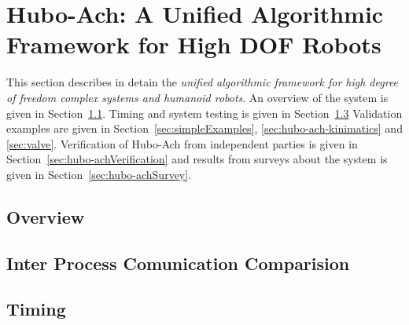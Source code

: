 \chapter{Hubo-Ach: A Unified Algorithmic Framework for High DOF Robots}\label{sec:hubo-ach}


This section describes in detain the \textit{unified algorithmic framework for high degree of freedom complex systems and humanoid robots}.
An overview of the system is given in Section~\ref{sec:ach:overview}.
Timing and system testing is given in Section~\ref{sec:timing}
Validation examples are given in Section~\ref{sec:simpleExamples}, \ref{sec:hubo-ach-kinimatics} and \ref{sec:valve}.
Verification of Hubo-Ach from independent parties is given in Section~\ref{sec:hubo-achVerification} and results from surveys about the system is given in Section~\ref{sec:hubo-achSurvey}.


\section{Overview}\label{sec:ach:overview}




\section{Inter Process Comunication Comparision}\label{sec:ipc}
	
\section{Timing}\label{sec:timing}
	
